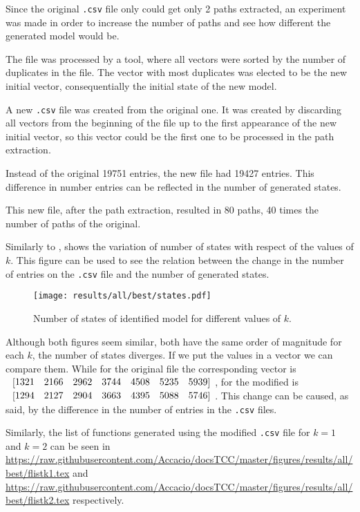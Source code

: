 Since the original \verb|.csv| file only could get only 2 paths extracted, an
experiment was made in order to increase the number of paths and see how
different the generated model would be.

The file was processed by a tool, where all vectors
were sorted by the number of duplicates in the file. The vector with most
duplicates was elected to be the new initial vector, consequentially the initial
state of the new model.

A new \verb|.csv| file was created from the original one. It was created by
discarding all vectors from the beginning of the file up to the
first appearance of the new initial vector, so this vector could be the first
one to be processed in the path extraction.

Instead of the original 19751 entries, the new
file 
had 19427 entries. This difference in number entries can be reflected in the number of
generated states.

This new file, after the path extraction, resulted in 80 paths, 40 times the
number of paths of the original.  

Similarly to , 
shows the variation of number of states with respect of the values of $k$. This
figure can be used to see the relation
between the change in the number of entries on the \verb|.csv| file and the
number of generated states.
\begin{figure}[H]
  \centering
  \texttt{[image: results/all/best/states.pdf]}
  \caption{Number of states of identified model for different values of $k$.}
    \label{fig:statesIdentBest}
\end{figure}
Although both figures seem similar, both have the same order of magnitude for
each $k$, the number of states diverges. If we put the values in a vector we can
compare them. While for the original file the corresponding vector is
$\colvec{1321& 2166& 2962& 3744& 4508& 5235& 5939}$, for the modified is 
$\colvec{1294& 2127& 2904& 3663& 4395& 5088& 5746}$.
This change can be caused, as said, by the difference in the number of entries
in the \verb|.csv| files.

Similarly, the list of \ffunction{} functions generated using the modified \verb|.csv| file
for $k=1$ and $k=2$
can be seen in  
\url{https://raw.githubusercontent.com/Accacio/docsTCC/master/figures/results/all/best/flistk1.tex}
and
\url{https://raw.githubusercontent.com/Accacio/docsTCC/master/figures/results/all/best/flistk2.tex}
respectively.


